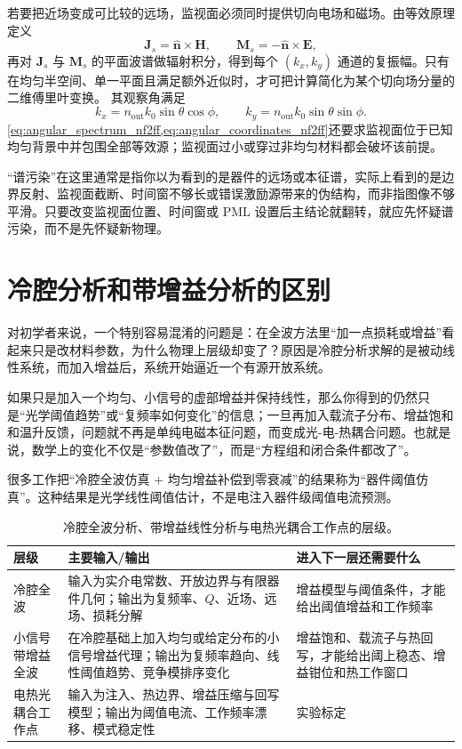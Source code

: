 若要把近场变成可比较的远场，监视面必须同时提供切向电场和磁场。由等效原理定义
\begin{equation}
\bm J_s=\hat{\bm n}\times\bm H,
\qquad
\bm M_s=-\hat{\bm n}\times\bm E,
\label{eq:angular_spectrum_nf2ff}
\end{equation}
再对 $\bm J_s$ 与 $\bm M_s$ 的平面波谱做辐射积分，得到每个 $(k_x,k_y)$ 通道的复振幅。只有在均匀半空间、单一平面且满足额外近似时，才可把计算简化为某个切向场分量的二维傅里叶变换。
其观察角满足
\begin{equation}
k_x = n_{\mathrm{out}}k_0\sin\theta\cos\phi,
\qquad
k_y = n_{\mathrm{out}}k_0\sin\theta\sin\phi.
\label{eq:angular_coordinates_nf2ff}
\end{equation}
\cref{eq:angular_spectrum_nf2ff,eq:angular_coordinates_nf2ff}还要求监视面位于已知均匀背景中并包围全部等效源；监视面过小或穿过非均匀材料都会破坏该前提。

\begin{PitfallBox}
“谱污染”在这里通常是指你以为看到的是器件的远场或本征谱，实际上看到的是边界反射、监视面截断、时间窗不够长或错误激励源带来的伪结构，而非指图像不够平滑。只要改变监视面位置、时间窗或 PML 设置后主结论就翻转，就应先怀疑谱污染，而不是先怀疑新物理。
\end{PitfallBox}

\section{冷腔分析和带增益分析的区别}
对初学者来说，一个特别容易混淆的问题是：在全波方法里“加一点损耗或增益”看起来只是改材料参数，为什么物理上层级却变了？原因是冷腔分析求解的是被动线性系统，而加入增益后，系统开始逼近一个有源开放系统。

如果只是加入一个均匀、小信号的虚部增益并保持线性，那么你得到的仍然只是“光学阈值趋势”或“复频率如何变化”的信息；一旦再加入载流子分布、增益饱和和温升反馈，问题就不再是单纯电磁本征问题，而变成光-电-热耦合问题。也就是说，数学上的变化不仅是“参数值改了”，而是“方程组和闭合条件都改了”。

很多工作把“冷腔全波仿真 + 均匀增益补偿到零衰减”的结果称为“器件阈值仿真”。这种结果是光学线性阈值估计，不是电注入器件级阈值电流预测。

\begin{table}[htbp]
  \centering
  \footnotesize
  \caption{冷腔全波分析、带增益线性分析与电热光耦合工作点的层级。}
  \label{tab:cold_vs_gain_fullwave}
  \begin{tabularx}{\textwidth}{@{}p{2.5cm}p{4.5cm}Y@{}}
    \toprule
    层级 & 主要输入/输出 & 进入下一层还需要什么 \\ \midrule
    冷腔全波 & 输入为实介电常数、开放边界与有限器件几何；输出为复频率、$Q$、近场、远场、损耗分解 & 增益模型与阈值条件，才能给出阈值增益和工作频率 \\
    小信号带增益全波 & 在冷腔基础上加入均匀或给定分布的小信号增益代理；输出为复频率趋向、线性阈值趋势、竞争模排序变化 & 增益饱和、载流子与热回写，才能给出阈上稳态、增益钳位和热工作窗口 \\
    电热光耦合工作点 & 输入为注入、热边界、增益压缩与回写模型；输出为阈值电流、工作频率漂移、模式稳定性 & 实验标定 \\
    \bottomrule
  \end{tabularx}
\end{table}

